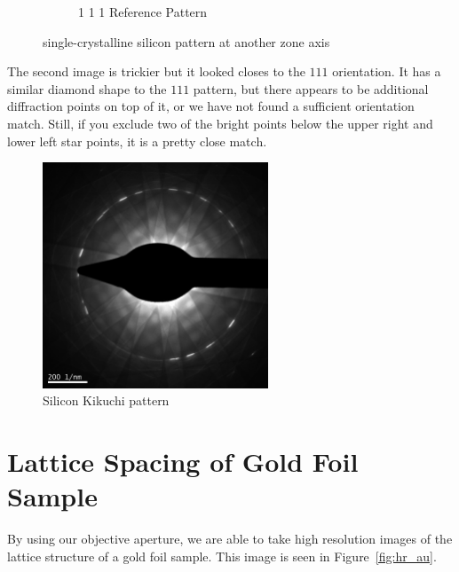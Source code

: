 \documentclass[12pt,a4paper]{article}
\begin{document}
\begin{figure}[htbp]
\begin{subfigure}[b]{0.45\textwidth}
    \caption{1 1 1 Reference Pattern}
    \label{fig:111}
  \end{subfigure}%
  \caption{single-crystalline silicon pattern at another zone axis}
  \label{fig:zone2}
\end{figure}

The second image is trickier but it looked closes to the $1 1 1 $ orientation.  It has a similar diamond shape to the $1 1 1$ pattern, but there appears to be additional diffraction points on top of it, or we have not found a sufficient orientation match.  Still,  if you exclude two of the bright points below the upper right and lower left star points, it is a pretty close match.


\begin{figure}[htbp]
  \centering
  \includegraphics[width=0.6\textwidth]{data/Image6 Si_Kikuchi.png}
  \caption{Silicon Kikuchi pattern}
  \label{fig:kikuchi}
\end{figure}

\section{Lattice Spacing of Gold Foil Sample} %
\label{sec:lattice_spacing_of_gold_foil_sample}

By using our objective aperture, we are able to take high resolution images of the lattice structure of a gold foil sample.  This image is seen in Figure~\ref{fig:hr_au}.
\end{document}
